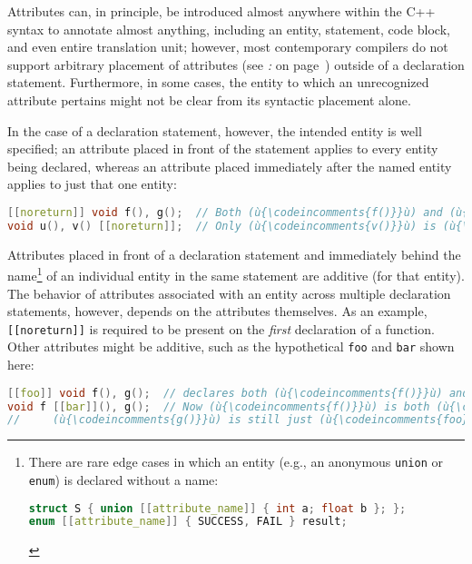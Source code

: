 Attributes can, in principle, be introduced almost anywhere within the
C++ syntax to annotate almost anything, including an entity,
statement, code block, and even entire translation
unit; however, most contemporary compilers do not support arbitrary
placement of attributes (see {\it{}:} {\it{}} on page~\pageref{probing-where-attributes-are-permitted-in-the-compiler’s-c++-grammar}) outside of a
declaration statement. Furthermore, in some cases, the entity to
which an unrecognized attribute pertains might not be clear from its
syntactic placement alone.

In the case of a declaration statement, however, the intended entity is
well specified; an attribute placed in front of the statement applies to
every entity being declared, whereas an attribute placed immediately
after the named entity applies to just that one entity:

\begin{lstlisting}[language=C++]
[[noreturn]] void f(), g();  // Both (ù{\codeincomments{f()}}ù) and (ù{\codeincomments{g()}}ù) are (ù{\codeincomments{noreturn}}ù).
void u(), v() [[noreturn]];  // Only (ù{\codeincomments{v()}}ù) is (ù{\codeincomments{noreturn}}ù).
\end{lstlisting}

\noindent Attributes placed in front of a declaration statement and immediately
behind the name{\cprotect\footnote{There are rare edge cases in which an
entity (e.g., an anonymous \texttt{union} or \texttt{enum}) is
declared without a name:

\begin{lstlisting}[language=C++, basicstyle={\ttfamily\footnotesize}]
struct S { union [[attribute_name]] { int a; float b }; };
enum [[attribute_name]] { SUCCESS, FAIL } result;
\end{lstlisting} \vspace*{-1ex}
}} of an individual entity in the same statement are additive (for
that entity). The behavior of attributes associated with an entity
across multiple declaration statements, however, depends on the
attributes themselves. As an example, \texttt{[[noreturn]]} is required
to be present on the \emph{first} declaration of a function. Other
attributes might be additive, such as the hypothetical \texttt{foo} and
\texttt{bar} shown here:

\begin{lstlisting}[language=C++]
[[foo]] void f(), g();  // declares both (ù{\codeincomments{f()}}ù) and (ù{\codeincomments{g()}}ù) to be (ù{\codeincomments{foo}}ù)
void f [[bar]](), g();  // Now (ù{\codeincomments{f()}}ù) is both (ù{\codeincomments{foo}}ù) and (ù{\codeincomments{bar}}ù) while
//     (ù{\codeincomments{g()}}ù) is still just (ù{\codeincomments{foo}}ù).
\end{lstlisting}

